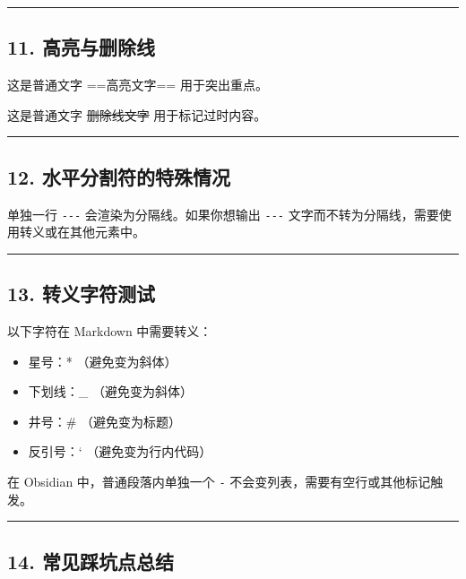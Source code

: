 \documentclass[]{article}
\providecommand{\tightlist}{\itemsep0pt}
\begin{document}
\begin{center}\rule{0.5\linewidth}{0.5pt}\end{center}

\subsection{11.
高亮与删除线}\label{ux9ad8ux4eaeux4e0eux5220ux9664ux7ebf}

这是普通文字 ==高亮文字== 用于突出重点。

这是普通文字 \st{删除线文字} 用于标记过时内容。

\begin{center}\rule{0.5\linewidth}{0.5pt}\end{center}

\subsection{12.
水平分割符的特殊情况}\label{ux6c34ux5e73ux5206ux5272ux7b26ux7684ux7279ux6b8aux60c5ux51b5}

单独一行 \texttt{-\/-\/-} 会渲染为分隔线。如果你想输出 \texttt{-\/-\/-}
文字而不转为分隔线，需要使用转义或在其他元素中。

\begin{center}\rule{0.5\linewidth}{0.5pt}\end{center}

\subsection{13.
转义字符测试}\label{ux8f6cux4e49ux5b57ux7b26ux6d4bux8bd5}

以下字符在 Markdown 中需要转义：

\begin{itemize}
\tightlist
\item
  星号：* （避免变为斜体）
\item
  下划线：\_ （避免变为斜体）
\item
  井号：\# （避免变为标题）
\item
  反引号：` （避免变为行内代码）
\end{itemize}

在 Obsidian 中，普通段落内单独一个 \texttt{-}
不会变列表，需要有空行或其他标记触发。

\begin{center}\rule{0.5\linewidth}{0.5pt}\end{center}

\subsection{14.
常见踩坑点总结}\label{ux5e38ux89c1ux8e29ux5751ux70b9ux603bux7ed3}
\end{document}
